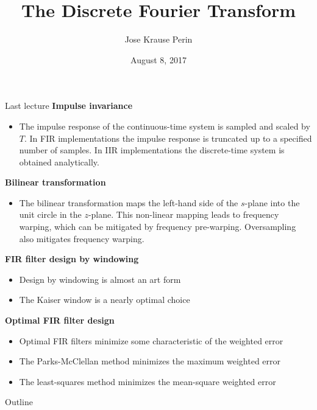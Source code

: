 \documentclass[10pt]{beamer}
\title[EE 264]{The Discrete Fourier Transform}
\author{Jose Krause Perin}
\institute{Stanford University}
\date{August 8, 2017}
\begin{document}
\begin{frame}
  \titlepage
\end{frame}

%
\begin{frame}{Last lecture}
\textbf{Impulse invariance}
\begin{itemize}
	\item The impulse response of the continuous-time system is sampled and scaled by $T$. In FIR implementations the impulse response is truncated up to a specified number of samples. In IIR implementations the discrete-time system is obtained analytically.
\end{itemize}

\textbf{Bilinear transformation}
\begin{itemize}
	\item The bilinear transformation maps the left-hand side of the $s$-plane into the unit circle in the $z$-plane. This non-linear mapping leads to frequency warping, which can be mitigated by frequency pre-warping. Oversampling also mitigates frequency warping.
\end{itemize}

\textbf{FIR filter design by windowing}
\begin{itemize}
	\item Design by windowing is almost an art form
	\item The Kaiser window is a nearly optimal choice
\end{itemize}

\textbf{Optimal FIR filter design}
\begin{itemize}
	\item Optimal FIR filters minimize some characteristic of the weighted error
	\item The Parks-McClellan method minimizes the maximum weighted error
	\item The least-squares method minimizes the mean-square weighted error
\end{itemize}	
\end{frame}

%
\begin{frame}{Outline}
	\tableofcontents
\end{frame}

%
\end{document}
